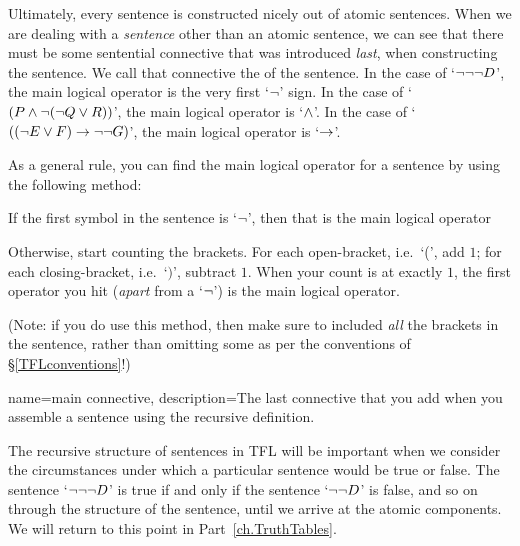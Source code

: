 Ultimately, every sentence is constructed nicely out of atomic sentences. When we are dealing with a \emph{sentence} other than an atomic sentence, we can see that there must be some sentential connective that was introduced \emph{last}, when constructing the sentence. We call that connective the  of the sentence. In the case of `$\neg\neg\neg D$', the main logical operator is the very first `$\neg$' sign. In the case of `$(P \wedge \neg (\neg Q \vee R))$', the main logical operator is `$\wedge$'. In the case of `$((\neg E \vee F) \rightarrow \neg\neg G)$', the main logical operator is `$\rightarrow$'.

As a general rule, you can find the main logical operator for a sentence by using the following method:
\begin{ebullet}
	\item If the first symbol in the sentence is `$\neg$', then that is the main logical operator
	\item Otherwise, start counting the brackets. For each open-bracket, i.e.\ `(', add $1$; for each closing-bracket, i.e.\ `$)$', subtract $1$. When your count is at exactly $1$, the first operator you hit (\emph{apart} from a `$\neg$') is the main logical operator. 
\end{ebullet}

(Note: if you do use this method, then make sure to included \emph{all} the brackets in the sentence, rather than omitting some as per the conventions of \S\ref{TFLconventions}!)

{
name=main connective,
description={The last connective that you add when you assemble a sentence using the recursive definition.}
}

The recursive structure of sentences in TFL will be important when we consider the circumstances under which a particular sentence would be true or false. The sentence `$\neg \neg \neg D$' is true if and only if the sentence `$\neg \neg D$' is false, and so on through the structure of the sentence, until we arrive at the atomic components. We will return to this point in Part~\ref{ch.TruthTables}.

